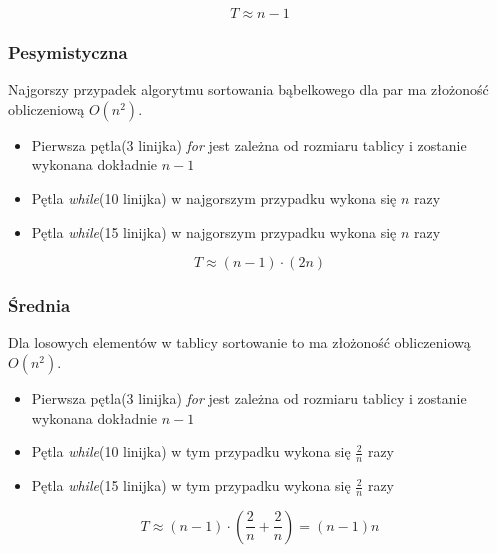 \begin{equation*}
T \approx n -1
\end{equation*}
\wyjT
\subsubsection*{Pesymistyczna}
Najgorszy przypadek algorytmu sortowania bąbelkowego dla par ma złożoność obliczeniową $O(n^2)$.
\begin{itemize}
\item Pierwsza pętla(3 linijka) \textit{for} jest zależna od rozmiaru tablicy i zostanie wykonana dokładnie $n-1$
\item Pętla \textit{while}(10 linijka)  w najgorszym przypadku wykona się $n$ razy
\item Pętla \textit{while}(15 linijka)  w najgorszym przypadku wykona się $n$ razy
\end{itemize}
\begin{equation*}
T \approx (n -1) \cdot (2n) 
\end{equation*}
\wyjT
\subsubsection*{Średnia}
Dla losowych elementów w tablicy sortowanie to ma złożoność obliczeniową $O(n^2)$.
\begin{itemize}
\item Pierwsza pętla(3 linijka) \textit{for} jest zależna od rozmiaru tablicy i zostanie wykonana dokładnie $n-1$
\item Pętla \textit{while}(10 linijka)  w tym przypadku wykona się $\frac{2}{n}$ razy
\item Pętla \textit{while}(15 linijka)  w tym przypadku wykona się $\frac{2}{n}$ razy
\end{itemize}
\begin{equation*}
T \approx (n -1)\cdot (  \frac{2}{n} + \frac{2}{n}) = (n-1)n
\end{equation*}
\wyjT
